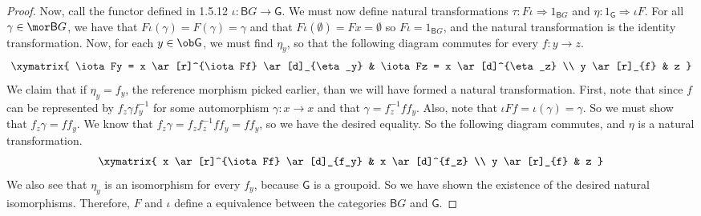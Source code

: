 \documentclass[main.tex]{subfiles}
\begin{document}
\begin{proof}
	Now, call the functor defined in 1.5.12  $\iota\colon \textsf{B}G \rightarrow
	\textsf{G}$. We must now define natural transformations $\tau\colon F\iota
	\Rightarrow 1_{\textsf{B}G} $ and $\eta\colon 1_{\textsf{G}}\Rightarrow \iota F$.
	For all $\gamma \in\mor\textsf{B}G$, we have that $F\iota(\gamma) =
	F(\gamma) = \gamma$ and that $F\iota(\emptyset) = Fx = \emptyset$ so $F\iota
	= 1_{\textsf{B}G}$, and the natural transformation is the identity
	transformation. Now, for each $y \in\ob\textsf{G}$, we must find $\eta_y$,
	so that the following diagram commutes for every $f\colon y \rightarrow z$.
	\[\xymatrix{
			\iota Fy = x
			\ar[r]^{\iota Ff}
			\ar[d]_{\eta_y}
			& \iota Fz = x
			\ar[d]^{\eta_z}
			\\
			y
			\ar[r]_{f}
			& z
	}\]
	We claim that if $\eta_y = f_y$, the reference morphism picked earlier, than
	we will have formed a natural transformation. First, note that since $f$ can
	be represented by $f_z\gamma f_y^{-1}$ for some automorphism $\gamma\colon x
	\rightarrow x$ and that $\gamma = f_z^{-1}ff_y$. Also, note that $\iota Ff =
	\iota(\gamma) = \gamma$. So we must show that $f_z\gamma = ff_y$. We know
	that $f_z\gamma = f_zf_z^{-1}ff_y = ff_y$, so we have the desired equality.
	So the following diagram commutes, and $\eta$ is a natural transformation.
	\begin{align}
		\xymatrix{
			x
			\ar[r]^{\iota Ff}
			\ar[d]_{f_y}
			&  x
			\ar[d]^{f_z}
			\\
			y
			\ar[r]_{f}
			& z
		}
	\end{align}
	We also see that $\eta_y$ is an isomorphism for every $f_y$, because
	$\textsf{G}$ is a groupoid. So we have shown the existence of the desired
	natural isomorphisms. Therefore, $F$ and $\iota$ define a equivalence
	between  the categories $\textsf{B}G$ and $\textsf{G}$.
\end{proof}
\end{document}
